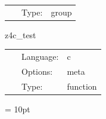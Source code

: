 \hspace{5mm}

 \begin{tabular*}{160mm}{cll} 
~ & Type:  & group \\ 
\end{tabular*} 


\vspace{5mm}


\hspace{5mm} z4c\_test 

\hspace{5mm}{\it self-test } 


\hspace{5mm}

 \begin{tabular*}{160mm}{cll} 
~ & Language:  & c \\ 
~ & Options:  & meta \\ 
~ & Type:  & function \\ 
\end{tabular*} 



\vspace{5mm}\parskip = 10pt 
